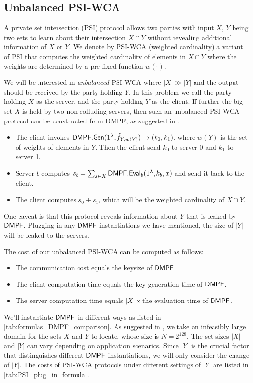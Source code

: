 \subsection{Unbalanced PSI-WCA}
A private set intersection (PSI) protocol allows two parties with input $X$, $Y$ being two sets to learn about their intersection $X\cap Y$ without revealing additional information of $X$ or $Y$. We denote by PSI-WCA (weighted cardinality) a variant of PSI that computes the weighted cardinality of elements in $X\cap Y$ where the weights are determined by a pre-fixed function $w(\cdot)$. 

We will be interested in \emph{unbalanced} PSI-WCA where $|X|\gg |Y|$ and the output should be received by the party holding $Y$. In this problem we call the party holding $X$ as the server, and the party holding $Y$ as the client. If further the big set $X$ is held by two non-colluding servers, then such an unbalanced PSI-WCA protocol can be constructed from DMPF, as suggested in \cite{cryptoeprint:2020/1599}: 
\begin{itemize}
  \item The client invokes ${\sf DMPF}.{\sf Gen}(1^\lambda, \hat{f}_{Y,w(Y)})\rightarrow (k_0,k_1)$, where $w(Y)$ is the set of weights of elements in $Y$. Then the client send $k_0$ to server 0 and $k_1$ to server 1. 
  \item Server $b$ computes $s_b=\sum_{x\in X}{\sf DMPF}.{\sf Eval}_b(1^\lambda, k_b,x)$ and send it back to the client. 
  \item The client computes $s_0+s_1$, which will be the weighted cardinality of $X\cap Y$. 
\end{itemize}
One caveat is that this protocol reveals information about $Y$ that is leaked by ${\sf DMPF}$. Plugging in any ${\sf DMPF}$ instantiations we have mentioned, the size of $|Y|$ will be leaked to the servers. 

The cost of our unbalanced PSI-WCA can be computed as follows: 
\begin{itemize}
  \item The communication cost equals the keysize of ${\sf DMPF}$. 
  \item The client computation time equals the key generation time of ${\sf DMPF}$. 
  \item The server computation time equals $|X|\times$the evaluation time of ${\sf DMPF}$. 
\end{itemize}

We'll instantiate ${\sf DMPF}$ in different ways as listed in \cref{tab:formulas_DMPF_comparison}. As suggested in \cite{cryptoeprint:2020/1599}, we take an infeasibly large domain for the sets $X$ and $Y$ to locate, whose size is $N = 2^{128}$. The set sizes $|X|$ and $|Y|$ can vary depending on application scenarios. Since $|Y|$ is the crucial factor that distinguishes different ${\sf DMPF}$ instantiations, we will only consider the change of $|Y|$. The costs of PSI-WCA protocols under different settings of $|Y|$ are listed in \cref{tab:PSI_plug_in_formula}. 


